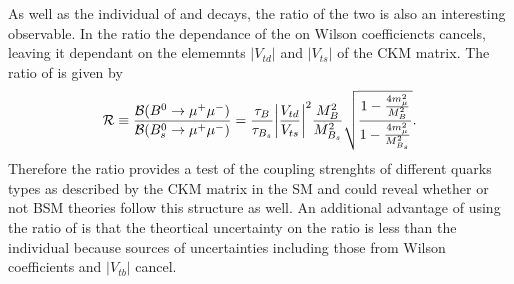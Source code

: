 {As well as the individual \BFs of \bdmumu and \bsmumu decays, the ratio of the two \BFs is also an interesting observable. 
In the ratio the dependance of the \BFs on Wilson coefficiencts cancels, leaving it dependant on the elememnts $|V_{td}|$ and $|V_{ts}|$ of the CKM matrix. The ratio of \BFs is given by 
\begin{equation}
  \mathcal{R} \equiv \frac{\mathcal{B}(B^{0} \to \mu^{+} \mu^{-})}{\mathcal{B}(B^{0}_{s}\to \mu^{+} \mu^{-})} = \frac{\tau_{B}}{\tau_{B_{s}}}
 \bigg{|} \frac{V_{td}}{V_{ts}} \bigg{|}^{2} \frac{M_{B}^{2}}{M_{B_{s}}^{2}} \sqrt{\frac{1 - \frac{4m_{\mu}^{2}}{M^{2}_{B}}}{1- \frac{4m_{\mu}^{2}}{M^{2}_{B_{s}}}}}.
\label{eq:BF_ratio}
\end{equation}
Therefore the ratio provides a test of the coupling strenghts of different quarks types as described by the CKM matrix in the SM and could reveal whether or not BSM theories follow this structure as well. 
An additional advantage of using the ratio of \BFs is that the theortical uncertainty on the ratio is less than the individual \BFs because sources of uncertainties including those from Wilson coefficients and $|V_{tb}|$ cancel.



}
